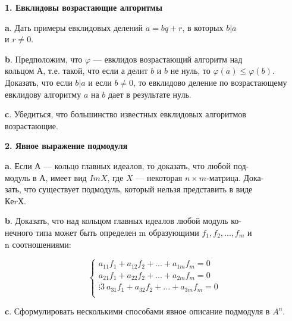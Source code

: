 \rule{0pt}{10pt}

{\noindent \bf 1. Евклидовы возрастающие алгоритмы} 

\medskip

{\bf a}. Дать примеры евклидовых делений $a = bq + r$, в которых $b | a$ \\
и $r\ne 0$. 

\medskip

{\bf b}. Предположим, что $\varphi$ — евклидов возрастающий алгоритм над\\ 
кольцом А, т.е. такой, что если а делит $b$ и $b$ не нуль, то $\varphi(a)  \leqslant \varphi(b)$. 
Доказать, что если $b | a$ и если $b\ne 0$, то евклидово деление по 
возрастающему евклидову алгоритму $a$ на $b$ дает в результате нуль. 

\medskip

{\bf c}. Убедиться, что большинство известных евклидовых алгоритмов\\ 
возрастающие. 

\medskip

{\noindent \bf 2. Явное выражение подмодуля} 

\medskip

{\bf a}. Если $А$ — кольцо главных идеалов, то доказать, что любой 
под-\\модуль в $А$, имеет вид $ImX$, где $X$ — некоторая $n \times m$-матрица. 
Дока-\\зать, что существует подмодуль, который нельзя представить в виде\\ 
$КеrХ$. 

\medskip

{\bf b}. Доказать, что над кольцом главных идеалов любой модуль 
ко-\\нечного типа может быть определен m образующими $f_1,f_2,...,f_m$ и\\ 
n соотношениями: 

\begin{equation}
\left\{\begin{gathered}
a_{11}f_1 + a_{12}f_2 + ... + a_{1m}f_m = 0\\
a_{21}f_1 + a_{22}f_2 + ... + a_{2m}f_m = 0\\
\vdots3\
a_{31}f_1 + a_{32}f_2 + ... + a_{3m}f_m = 0\\
\end{gathered}\right.
\end{equation}

\medskip

{\bf c}. Сформулировать несколькими способами явное описание 
подмодуля в $A^n$. 

